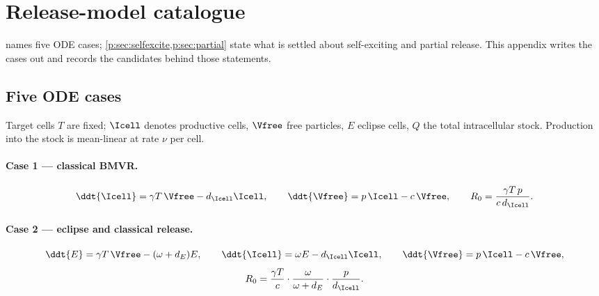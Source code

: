 
\section{Release-model catalogue}
\label{p:app:catalogue}

 names five ODE cases; \cref{p:sec:selfexcite,p:sec:partial}
state what is settled about self-exciting and partial release. This appendix
writes the cases out and records the candidates behind those statements.

\subsection{Five ODE cases}

Target cells $T$ are fixed; $\Icell$ denotes productive cells, $\Vfree$ free
particles, $E$ eclipse cells, $Q$ the total intracellular stock. Production
into the stock is mean-linear at rate $\nu$ per cell.

\paragraph{Case 1 --- classical BMVR.}
\begin{equation}
\ddt{\Icell}=\gamma T\,\Vfree-d_{\Icell}\Icell,
\qquad
\ddt{\Vfree}=p\,\Icell-c\,\Vfree,
\qquad
R_0=\frac{\gamma T\,p}{c\,d_{\Icell}}.
\label{p:eq:case1}
\end{equation}

\paragraph{Case 2 --- eclipse and classical release.}
\begin{equation}
\ddt{E}=\gamma T\,\Vfree-(\omega+d_E)E,
\qquad
\ddt{\Icell}=\omega E-d_{\Icell}\Icell,
\qquad
\ddt{\Vfree}=p\,\Icell-c\,\Vfree,
\label{p:eq:case2}
\end{equation}
\begin{equation}
R_0=\frac{\gamma T}{c}\cdot\frac{\omega}{\omega+d_E}\cdot\frac{p}{d_{\Icell}}.
\label{p:eq:case2R0}
\end{equation}

